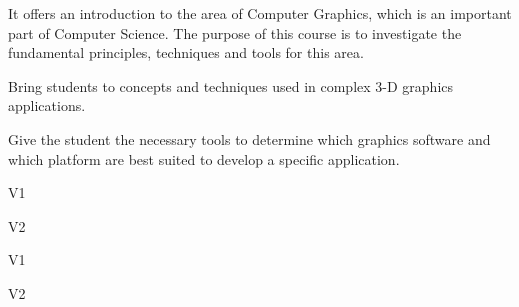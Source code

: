 \begin{syllabus}


\begin{justification}
It offers an introduction to the area of Computer Graphics, which is an important part of Computer Science.
The purpose of this course is to investigate the fundamental principles, techniques and tools for this area.
\end{justification}

\begin{goals}
\item Bring students to concepts and techniques used in complex 3-D graphics applications.
\item Give the student the necessary tools to determine which graphics software and which platform are best suited to develop a specific application.
\end{goals}

\begin{outcomes}{V1}
    \item {}
    \item {}
    \item {}
    \item {}
\end{outcomes}

\begin{outcomes}{V2}
    \item {}
    \item {}
    \item {}
\end{outcomes}

\begin{competences}{V1}
    \item {} 
    \item {} 
    \item {} 
    \item {} 
    \item {} 
\end{competences}

\begin{competences}{V2}
    \item {} 
    \item {} 
    \item {} 
    \item {} 
    \item {} 
\end{competences}


\end{syllabus}
